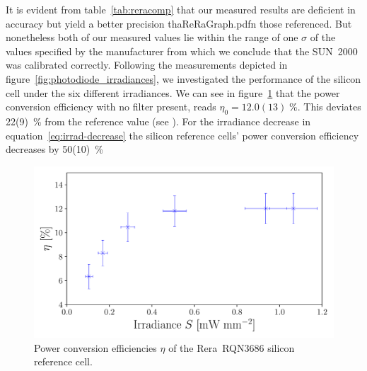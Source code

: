 It is evident from table~\ref{tab:reracomp} that our measured results are deficient in accuracy but yield a better precision thaReRaGraph.pdfn those referenced. But nonetheless both of our measured values lie within the range of one $\sigma$ of the values specified by the manufacturer from which we conclude that the SUN~2000 was calibrated correctly.\mypar
Following the measurements depicted in figure~\ref{fig:photodiode_irradiances}, we investigated the performance of the silicon cell under the six different irradiances. We can see in figure~\ref{fig:reraPCE} that the power conversion efficiency with no filter present, reads $\eta_0 = 12.0(13)\;\%$. This deviates 22(9)~\% from the reference value (see \cite{reracat}). For the irradiance decrease in equation~\ref{eq:irrad-decrease} the silicon reference cells’ power conversion efficiency decreases by 50(10)~\%
\begin{figure}[H]\centering
\includegraphics[scale=.5]{../2_Pictures/ReRaGraph.pdf}
\caption{Power conversion efficiencies $\eta$ of the Rera~RQN3686 silicon reference cell.}
\label{fig:reraPCE}
\end{figure}

